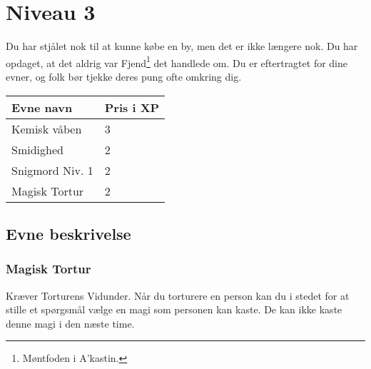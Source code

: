 \chapter{Niveau 3}
Du har stjålet nok til at kunne købe en by, men det er ikke længere nok. Du har opdaget, at det aldrig var Fjend\footnote{Møntfoden i A'kastin.} det handlede om. Du er eftertragtet for dine evner, og folk bør tjekke deres pung ofte omkring dig. 
\begin{table}[H]
    \centering
    \begin{tabular}{|p{}|p{}|}
    \rowcolor{cerulean!80}\hline
        Evne navn & Pris i XP \\\hline
        Kemisk våben & 3\\\hline
        Smidighed & 2\\\hline
        Snigmord Niv. 1 & 2\\\hline
        Magisk Tortur & 2 \\\hline
    \end{tabular}
\end{table}
\section{Evne beskrivelse}







\subsection{Magisk Tortur}
Kræver Torturens Vidunder. Når du torturere en person kan du i stedet for at stille et spørgsmål vælge en magi som personen kan kaste. De kan ikke kaste denne magi i den næste time.